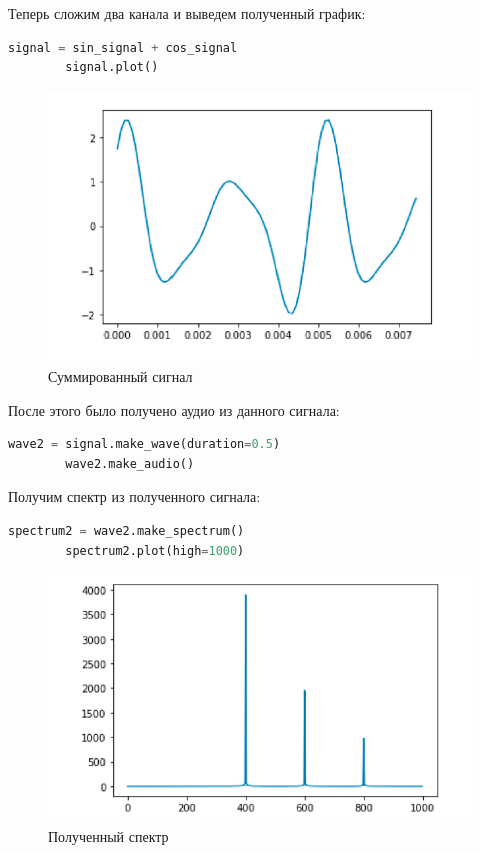 \documentclass[a4]{article}
\begin{document}
    Теперь сложим два канала и выведем полученный график:

    \begin{lstlisting}[language=Python, caption= Суммирование каналов, label={lst:sum_signal}]
        signal = sin_signal + cos_signal
        signal.plot()
    \end{lstlisting}

    \begin{figure}[H]
        \centering
        \includegraphics[width=\textwidth]{sum_signals}
        \caption{Суммированный сигнал}
        \label{fig:sum_signals}
    \end{figure}

    После этого было получено аудио из данного сигнала:

    \begin{lstlisting}[language=Python, caption= Получение аудио, label={lst:make_audio_from_signals}]
        wave2 = signal.make_wave(duration=0.5)
        wave2.make_audio()
    \end{lstlisting}

    Получим спектр из полученного сигнала:

    \begin{lstlisting}[language=Python, caption= Получение спектра, label={lst:make_spectr_from_signal}]
        spectrum2 = wave2.make_spectrum()
        spectrum2.plot(high=1000)
    \end{lstlisting}

    \begin{figure}[H]
        \centering
        \includegraphics[width=\textwidth]{spectr_signals}
        \caption{Полученный спектр}
        \label{fig:spectr_signals}
    \end{figure}
\end{document}
